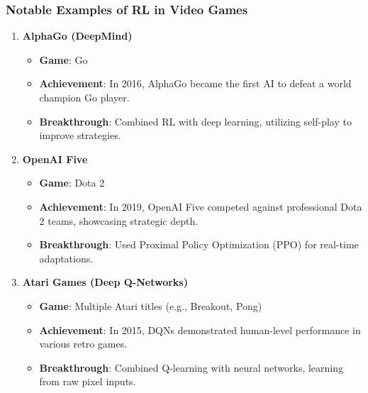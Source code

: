 \documentclass[aspectratio=169]{beamer}
\begin{document}
\begin{frame}[fragile]
  \frametitle{Notable Examples of RL in Video Games}
  \begin{enumerate}
    \item \textbf{AlphaGo (DeepMind)}
      \begin{itemize}
        \item \textbf{Game}: Go
        \item \textbf{Achievement}: In 2016, AlphaGo became the first AI to defeat a world champion Go player.
        \item \textbf{Breakthrough}: Combined RL with deep learning, utilizing self-play to improve strategies.
      \end{itemize}
      
    \item \textbf{OpenAI Five}
      \begin{itemize}
        \item \textbf{Game}: Dota 2
        \item \textbf{Achievement}: In 2019, OpenAI Five competed against professional Dota 2 teams, showcasing strategic depth.
        \item \textbf{Breakthrough}: Used Proximal Policy Optimization (PPO) for real-time adaptations.
      \end{itemize}
      
    \item \textbf{Atari Games (Deep Q-Networks)}
      \begin{itemize}
        \item \textbf{Game}: Multiple Atari titles (e.g., Breakout, Pong)
        \item \textbf{Achievement}: In 2015, DQNs demonstrated human-level performance in various retro games.
        \item \textbf{Breakthrough}: Combined Q-learning with neural networks, learning from raw pixel inputs.
      \end{itemize}
  \end{enumerate}
\end{frame}
\end{document}
